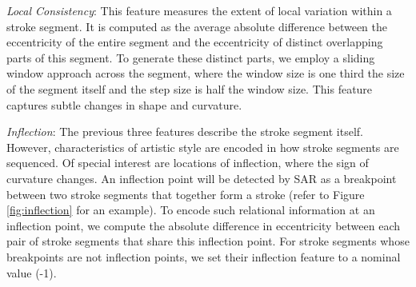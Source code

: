 \noindent \emph{Local Consistency}: This feature measures the extent of local variation within a stroke segment. It is computed as the average absolute difference between the eccentricity of the entire segment and the eccentricity of distinct overlapping parts of this segment. To generate these distinct parts, we employ a sliding window approach across the segment, where the window size is one third the size of the segment itself and the step size is half the window size. This feature captures subtle changes in shape and curvature.

\noindent \emph{Inflection}: The previous three features describe the stroke segment itself. However, characteristics of artistic style are encoded in how stroke segments are sequenced. Of special interest are locations of inflection, where the sign of curvature changes. An inflection point will be detected by SAR as a breakpoint between two stroke segments that together form a stroke (refer to Figure \ref{fig:inflection} for an example). To encode such relational information at an inflection point, we compute the absolute difference in eccentricity between each pair of stroke segments that share this inflection point. For stroke segments whose breakpoints are not inflection points, we set their inflection feature to a nominal value (-1).
%
%
%
%
%

